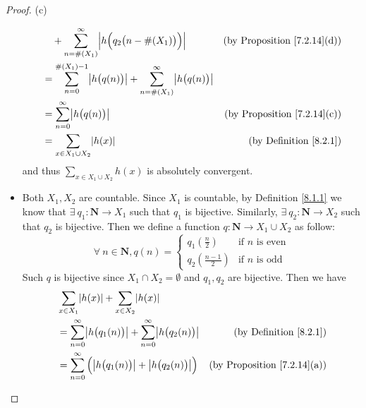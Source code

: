 \begin{proof}{(c)}
\begin{itemize}
\begin{align*}
                   & \quad + \sum_{n = \#(X_1)}^\infty \abs*{h\Big(q_2\big(n - \#(X_1)\big)\Big)}                           & \text{(by Proposition \ref{7.2.14}(d))} \\
                   & = \sum_{n = 0}^{\#(X_1) - 1} \abs*{h\big(q(n)\big)} + \sum_{n = \#(X_1)}^\infty \abs*{h\big(q(n)\big)}                                           \\
                   & = \sum_{n = 0}^\infty \abs*{h\big(q(n)\big)}                                                           & \text{(by Proposition \ref{7.2.14}(c))} \\
                   & = \sum_{x \in X_1 \cup X_2} \abs*{h(x)}                                                                & \text{(by Definition \ref{8.2.1})}
              \end{align*}
              and thus \(\sum_{x \in X_1 \cup X_2} h(x)\) is absolutely convergent.
        \item Both \(X_1, X_2\) are countable.
              Since \(X_1\) is countable, by Definition \ref{8.1.1} we know that \(\exists\ q_1 : \mathbf{N} \to X_1\) such that \(q_1\) is bijective.
              Similarly, \(\exists\ q_2 : \mathbf{N} \to X_2\) such that \(q_2\) is bijective.
              Then we define a function \(q : \mathbf{N} \to X_1 \cup X_2\) as follow:
              \[
                  \forall\ n \in \mathbf{N}, q(n) = \begin{cases}
                      q_1(\frac{n}{2})     & \text{if } n \text{ is even} \\
                      q_2(\frac{n - 1}{2}) & \text{if } n \text{ is odd}
                  \end{cases}
              \]
              Such \(q\) is bijective since \(X_1 \cap X_2 = \emptyset\) and \(q_1, q_2\) are bijective.
              Then we have
              \begin{align*}
                   & \sum_{x \in X_1} \abs*{h(x)} + \sum_{x \in X_2} \abs*{h(x)}                                                                                                     \\
                   & = \sum_{n = 0}^\infty \abs*{h\big(q_1(n)\big)} + \sum_{n = 0}^\infty \abs*{h\big(q_2(n)\big)}                         & \text{(by Definition \ref{8.2.1})}      \\
                   & = \sum_{n = 0}^\infty \Big(\abs*{h\big(q_1(n)\big)} + \abs*{h\big(q_2(n)\big)}\Big)                                   & \text{(by Proposition \ref{7.2.14}(a))} \\

\end{align*}
\end{itemize}
\end{proof}
